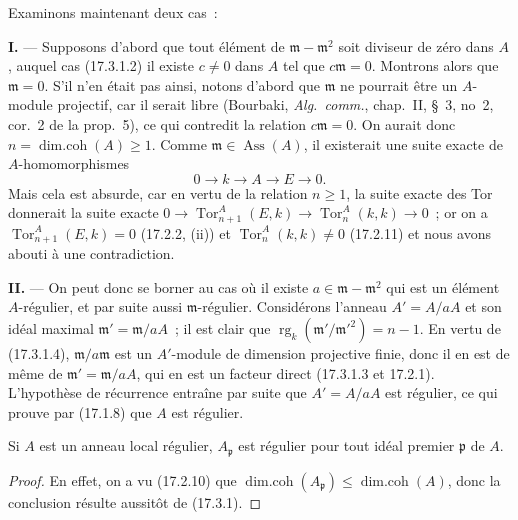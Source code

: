 Examinons maintenant deux cas~:

\medskip\noindent\textbf{I.} --- Supposons d'abord que tout élément de
$\mathfrak{m}-\mathfrak{m}^2$ soit diviseur de zéro dans $A$, auquel cas
(17.3.1.2) il existe $c\neq0$ dans $A$ tel que $c\mathfrak{m}=0$. Montrons
alors que $\mathfrak{m}=0$. S'il n'en était pas ainsi, notons d'abord que
$\mathfrak{m}$ ne pourrait être un $A$-module projectif, car il serait libre
(Bourbaki, \emph{Alg.~comm.}, chap.~II, \S~3, no~2, cor.~2 de la prop.~5),
ce qui contredit la relation $c\mathfrak{m}=0$. On aurait donc
$n=\operatorname{dim.coh}(A)\geq1$. Comme
$\mathfrak{m}\in\operatorname{Ass}(A)$, il existerait une suite exacte de
$A$-homomorphismes
\[
  0\longrightarrow k\longrightarrow A\longrightarrow E\longrightarrow0.
\]
Mais cela est absurde, car en vertu de la relation $n\geq1$, la suite exacte
des Tor donnerait la suite exacte
$0\longrightarrow\operatorname{Tor}^A_{n+1}(E,k)\longrightarrow
\operatorname{Tor}^A_n(k,k)\longrightarrow0$~; or on a
$\operatorname{Tor}^A_{n+1}(E,k)=0$ (17.2.2, (ii)) et
$\operatorname{Tor}^A_n(k,k)\neq0$ (17.2.11) et nous avons abouti à une
contradiction.

\medskip\noindent\textbf{II.} --- On peut donc se borner au cas où il existe
$a\in\mathfrak{m}-\mathfrak{m}^2$ qui est un élément $A$-régulier, et par
suite aussi $\mathfrak{m}$-régulier. Considérons l'anneau $A'=A/aA$ et son
idéal
maximal $\mathfrak{m}'=\mathfrak{m}/aA$~; il est clair que
$\operatorname{rg}_k(\mathfrak{m}'/\mathfrak{m}'^2)=n-1$. En vertu de
(17.3.1.4), $\mathfrak{m}/a\mathfrak{m}$ est un $A'$-module de dimension
projective finie, donc il en est de même de
$\mathfrak{m}'=\mathfrak{m}/aA$, qui en est un facteur direct (17.3.1.3 et
17.2.1). L'hypothèse de récurrence entraîne par suite que $A'=A/aA$ est
régulier, ce qui prouve par (17.1.8) que $A$ est régulier.

\begin{corollary}[17.3.2]
\label{0.17.3.2-fr}
Si $A$ est un anneau local régulier, $A_{\mathfrak{p}}$ est régulier pour tout
idéal premier $\mathfrak{p}$ de $A$.
\end{corollary}

\begin{proof}
En effet, on a vu (17.2.10) que
$\operatorname{dim.coh}(A_{\mathfrak{p}})\leq
\operatorname{dim.coh}(A)$, donc la conclusion résulte aussitôt de (17.3.1).
\end{proof}

